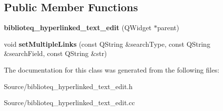 \subsection*{Public Member Functions}
\begin{DoxyCompactItemize}
\item 
{\bfseries biblioteq\+\_\+hyperlinked\+\_\+text\+\_\+edit} (Q\+Widget $\ast$parent)\hypertarget{classbiblioteq__hyperlinked__text__edit_a0341be34b832ac836f622a075b4e65c6}{}\label{classbiblioteq__hyperlinked__text__edit_a0341be34b832ac836f622a075b4e65c6}

\item 
void {\bfseries set\+Multiple\+Links} (const Q\+String \&search\+Type, const Q\+String \&search\+Field, const Q\+String \&str)\hypertarget{classbiblioteq__hyperlinked__text__edit_a80fe7ccc07d4d3559979db6dd128dd54}{}\label{classbiblioteq__hyperlinked__text__edit_a80fe7ccc07d4d3559979db6dd128dd54}

\end{DoxyCompactItemize}


The documentation for this class was generated from the following files\+:\begin{DoxyCompactItemize}
\item 
Source/biblioteq\+\_\+hyperlinked\+\_\+text\+\_\+edit.\+h\item 
Source/biblioteq\+\_\+hyperlinked\+\_\+text\+\_\+edit.\+cc\end{DoxyCompactItemize}
